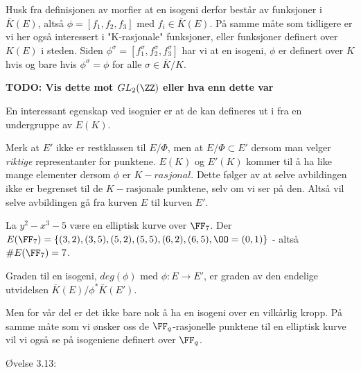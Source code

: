 
Husk fra definisjonen av morfier at en isogeni derfor består av funksjoner i $\overline{K}(E)$, altså $\phi = [f_1, f_2, f_3]$ med $f_i \in \overline{K}(E)$. På samme måte som tidligere er vi her også interessert i "K-rasjonale" funksjoner, eller funksjoner definert over $K(E)$ i steden. Siden $\phi^\sigma = [f_1^\sigma, f_2^\sigma, f_3^\sigma]$ har vi at en isogeni, $\phi$ er definert over $K$ hvis og bare hvis $\phi^\sigma = \phi$ for alle $\sigma \in \overline{K}/K$.

\textbf{TODO: Vis dette mot $GL_2(\ZZ)$ eller hva enn dette var} 

En interessant egenskap ved isognier er at de kan defineres ut i fra en undergruppe av $E(K)$. 


Merk at $E'$ ikke er restklassen til $E/\Phi$, men at $E/\Phi \subset E'$ dersom man velger \textit{riktige} representanter for punktene. $E(K)$ og $E'(K)$ kommer til å ha like mange elementer dersom $\phi$ er $K-rasjonal$. Dette følger av at selve avbildingen ikke er begrenset til de $K-$rasjonale punktene, selv om vi ser på den. Altså vil selve avbildingen gå fra kurven $E$ til kurven $E'$.

\begin{eksempel}
La $y^2 - x^3 - 5$ være en elliptisk kurve over $\FF_7$. Der $E(\FF_7) = \{(3,2), (3,5), (5,2), (5,5), (6,2), (6,5), \OO = (0,1) \}$ - altså $\#E(\FF_7) = 7$.
\end{eksempel}
         	 	
\begin{definisjon}
Graden til en isogeni, $deg(\phi)$ med $\phi: E \rightarrow E'$, er graden av den endelige utvidelsen $\overline{K}(E)/\phi^*\overline{K}(E')$.
\end{definisjon}


Men for vår del er det ikke bare nok å ha en isogeni over en vilkårlig kropp. På samme måte som vi ønsker oss de $\FF_q$-rasjonelle punktene til en elliptisk kurve vil vi også se på isogeniene definert over $\FF_q$.

Øvelse 3.13: